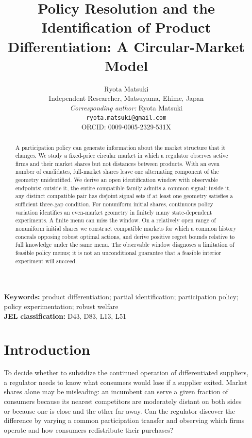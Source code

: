 \documentclass[11pt]{article}
\title{Policy Resolution and the Identification of Product Differentiation: A Circular-Market Model}
\author{Ryota Matsuki\\
Independent Researcher, Matsuyama, Ehime, Japan\\
\textit{Corresponding author:} Ryota Matsuki\\
\texttt{ryota.matsuki@gmail.com}\\
ORCID: 0009-0005-2329-531X}
\date{}
\begin{document}
\maketitle
\begin{abstract}
A participation policy can generate information about the market structure that it changes. We study a fixed-price circular market in which a regulator observes active firms and their market shares but not distances between products. With an even number of candidates, full-market shares leave one alternating component of the geometry unidentified. We derive an open identification window with observable endpoints: outside it, the entire compatible family admits a common signal; inside it, any distinct compatible pair has disjoint signal sets if at least one geometry satisfies a sufficient three-gap condition. For nonuniform initial shares, continuous policy variation identifies an even-market geometry in finitely many state-dependent experiments. A finite menu can miss the window. On a relatively open range of nonuniform initial shares we construct compatible markets for which a common history conceals opposing robust optimal actions, and derive positive regret bounds relative to full knowledge under the same menu. The observable window diagnoses a limitation of feasible policy menus; it is not an unconditional guarantee that a feasible interior experiment will succeed.
\end{abstract}
\noindent\textbf{Keywords:} product differentiation; partial identification; participation policy; policy experimentation; robust welfare\\
\textbf{JEL classification:} D43, D83, L13, L51

\section{Introduction}
To decide whether to subsidize the continued operation of differentiated suppliers, a regulator needs to know what consumers would lose if a supplier exited. Market shares alone may be misleading: an incumbent can serve a given fraction of consumers because its nearest competitors are moderately distant on both sides or because one is close and the other far away. Can the regulator discover the difference by varying a common participation transfer and observing which firms operate and how consumers redistribute their purchases?
\end{document}
